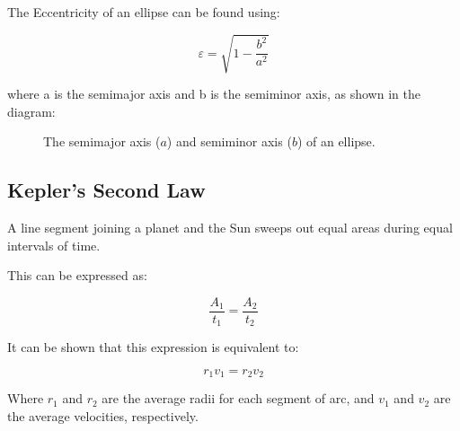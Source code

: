 		The Eccentricity of an ellipse can be found using: 
		
			\begin{mdframed}[backgroundcolor=orange!20!white]
			
			\begin{equation}
			\varepsilon = \sqrt{1-\frac{b^2}{a^2}} 
			\label{equation:eccentricity}
			\end{equation}
		\end{mdframed}
		where a is the semimajor axis and b is the semiminor axis, as shown in the diagram:
		

			\begin{figure}[H]
\begin{center}
	

		\caption{The semimajor axis ($a$) and semiminor axis ($b$) of an ellipse.}
		\end{center}
		\end{figure}
			
	\subsection{Kepler's Second Law}
		A line segment joining a planet and the Sun sweeps out equal areas during equal intervals of time.
		
		This can be expressed as: 
		
				
		\begin{mdframed}[backgroundcolor=orange!20!white]
			
			\begin{equation}
			\frac{A_1}{t_1} = \frac{A_2}{t_2}
			\label{equation:kep2nd}
			\end{equation}
		\end{mdframed}
		
		It can be shown that this expression is equivalent to:
		
		
					
		\begin{mdframed}[backgroundcolor=orange!20!white]
			
			\begin{equation}
			r_1 v_1 = r_2 v_2
			\label{equation:kep2ndalt}
			\end{equation}
		\end{mdframed}
		Where $r_1$ and {$r_2$} are the average radii for each segment of arc, and $v_1$ and $v_2$ are the average velocities, respectively. 
		
